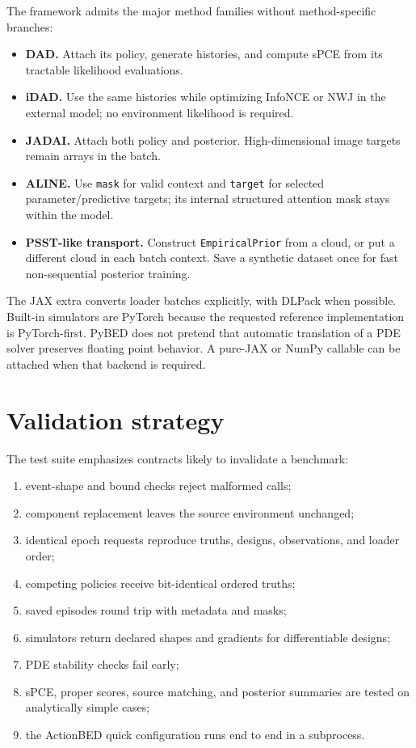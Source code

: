 \documentclass[11pt]{article}
\begin{document}
The framework admits the major method families without method-specific branches:
\begin{itemize}
  \item \textbf{DAD.} Attach its policy, generate histories, and compute sPCE from
  its tractable likelihood evaluations.
  \item \textbf{iDAD.} Use the same histories while optimizing InfoNCE or NWJ in the
  external model; no environment likelihood is required.
  \item \textbf{JADAI.} Attach both policy and posterior. High-dimensional image
  targets remain arrays in the batch.
  \item \textbf{ALINE.} Use \texttt{mask} for valid context and \texttt{target} for
  selected parameter/predictive targets; its internal structured attention mask stays
  within the model.
  \item \textbf{PSST-like transport.} Construct \texttt{EmpiricalPrior} from a cloud,
  or put a different cloud in each batch context. Save a synthetic dataset once for
  fast non-sequential posterior training.
\end{itemize}

The JAX extra converts loader batches explicitly, with DLPack when possible. Built-in
simulators are PyTorch because the requested reference implementation is PyTorch-first.
PyBED does not pretend that automatic translation of a PDE solver preserves floating
point behavior. A pure-JAX or NumPy callable can be attached when that backend is
required.

\section{Validation strategy}

The test suite emphasizes contracts likely to invalidate a benchmark:
\begin{enumerate}
  \item event-shape and bound checks reject malformed calls;
  \item component replacement leaves the source environment unchanged;
  \item identical epoch requests reproduce truths, designs, observations, and loader
  order;
  \item competing policies receive bit-identical ordered truths;
  \item saved episodes round trip with metadata and masks;
  \item simulators return declared shapes and gradients for differentiable designs;
  \item PDE stability checks fail early;
  \item sPCE, proper scores, source matching, and posterior summaries are tested on
  analytically simple cases;
  \item the ActionBED quick configuration runs end to end in a subprocess.
\end{enumerate}
\end{document}
